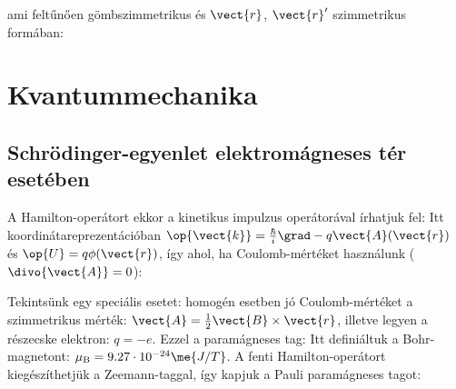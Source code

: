 \begin{description}
     ami feltűnően gömbszimmetrikus és $\vect{r}$, $\vect{r}'$ szimmetrikus formában:
   \end{description}
   
 \section{Kvantummechanika}
  
  \subsection{Schrödinger-egyenlet elektromágneses tér esetében}
   
   A Hamilton-operátort ekkor a kinetikus impulzus operátorával írhatjuk fel:
   Itt koordinátareprezentációban $\op{\vect{k}}=\frac{\hbar}{i}\grad-q\vect{A}(\vect{r})$ és $\op{U}=q\phi(\vect{r})$, így 
   ahol, ha Coulomb-mértéket használunk ($\divo{\vect{A}}=0$):
   
   Tekintsünk egy speciális esetet: homogén esetben jó Coulomb-mértéket a szimmetrikus mérték: $\vect{A}=\frac 12\vect{B}\times\vect{r}$, illetve legyen a részecske elektron: $q=-e$.
   Ezzel a paramágneses tag:
   Itt definiáltuk a Bohr-magnetont: $\mu_\text{B}=9.27\cdot 10^{-24}\me{J/T}$.
   A fenti Hamilton-operátort kiegészíthetjük a Zeemann-taggal, így kapjuk a Pauli paramágneses tagot:
   
